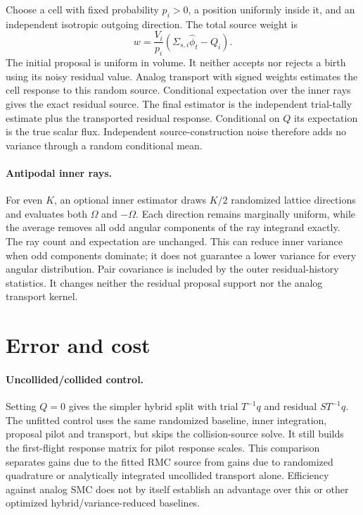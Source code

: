 \documentclass[11pt]{article}
\begin{document}
Choose a cell with fixed probability $p_i>0$, a position uniformly inside it,
and an independent isotropic outgoing direction. The total source weight is
\begin{equation}
 w=\frac{V_i}{p_i}(\Sigma_{s,i}\widehat\phi_t-Q_i).
\end{equation}
The initial proposal is uniform in volume. It neither accepts nor rejects a birth
using its noisy residual value. Analog transport with signed weights estimates
the cell response to this random source. Conditional expectation over the inner
rays gives the exact residual source. The final estimator is the independent
trial-tally estimate plus the transported residual response. Conditional on $Q$
its expectation is the true scalar flux. Independent source-construction noise
therefore adds no variance through a random conditional mean.

\paragraph{Antipodal inner rays.}
For even $K$, an optional inner estimator draws $K/2$ randomized lattice
directions and evaluates both $\Omega$ and $-\Omega$. Each direction remains
marginally uniform, while the average removes all odd angular components of the
ray integrand exactly. The ray count and expectation are unchanged. This can
reduce inner variance when odd components dominate; it does not guarantee a
lower variance for every angular distribution. Pair covariance is included by
the outer residual-history statistics. It changes neither the residual proposal
support nor the analog transport kernel.

\section{Error and cost}
\paragraph{Uncollided/collided control.}
Setting $Q=0$ gives the simpler hybrid split with trial $T^{-1}q$ and residual
$ST^{-1}q$. The unfitted control uses the same randomized baseline, inner
integration, proposal pilot and transport, but skips the collision-source solve.
It still builds the first-flight response matrix for pilot response scales.
This comparison separates gains due to the fitted RMC source from gains due to
randomized quadrature or analytically integrated uncollided transport alone.
Efficiency against analog SMC does not by itself establish an advantage over
this or other optimized hybrid/variance-reduced baselines.
\end{document}
